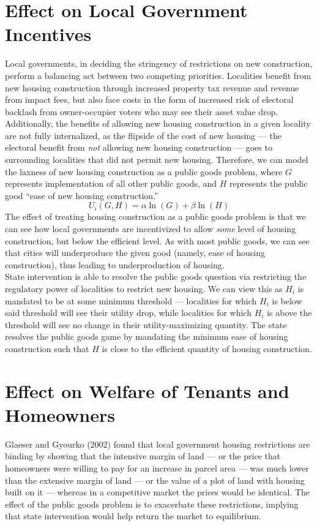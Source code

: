 \documentclass[12pt]{extarticle}
\begin{document}
  \section*{Effect on Local Government Incentives}%
  Local governments, in deciding the stringency of restrictions on new construction, perform a balancing act between two competing priorities. Localities benefit from new housing construction through increased property tax revenue and revenue from impact fees, but also face costs in the form of increased risk of electoral backlash from owner-occupier voters who may see their asset value drop.\\

  Additionally, the benefits of allowing new housing construction in a given locality are not fully internalized, as the flipside of the cost of new housing --- the electoral benefit from \textit{not} allowing new housing construction --- goes to surrounding localities that did not permit new housing. Therefore, we can model the laxness of new housing construction as a public goods problem, where $G$ represents implementation of all other public goods, and $H$ represents the public good ``ease of new housing construction.''
  \[U_i(G,H) = \alpha \ln(G) + \beta \ln(H)\]
  The effect of treating housing construction as a public goods problem is that we can see how local governments are incentivized to allow \textit{some} level of housing construction, but below the efficient level. As with most public goods, we can see that cities will underproduce the given good (namely, ease of housing construction), thus leading to underproduction of housing.\\

  State intervention is able to resolve the public goods question via restricting the regulatory power of localities to restrict new housing. We can view this as $H_i$ is mandated to be at some minimum threshold --- localities for which $H_i$ is below said threshold will see their utility drop, while localities for which $H_i$ is above the threshold will see no change in their utility-maximizing quantity. The state resolves the public goods game by mandating the minimum ease of housing construction such that $H$ is close to the efficient quantity of housing construction.
  \section*{Effect on Welfare of Tenants and Homeowners}%
  Glaeser and Gyourko (2002) found that local government housing restrictions are binding by showing that the intensive margin of land --- or the price that homeowners were willing to pay for an increase in parcel area --- was much lower than the extensive margin of land --- or the value of a plot of land with housing built on it --- whereas in a competitive market the prices would be identical. The effect of the public goods problem is to exacerbate these restrictions, implying that state intervention would help return the market to equilibrium.\\
\end{document}
